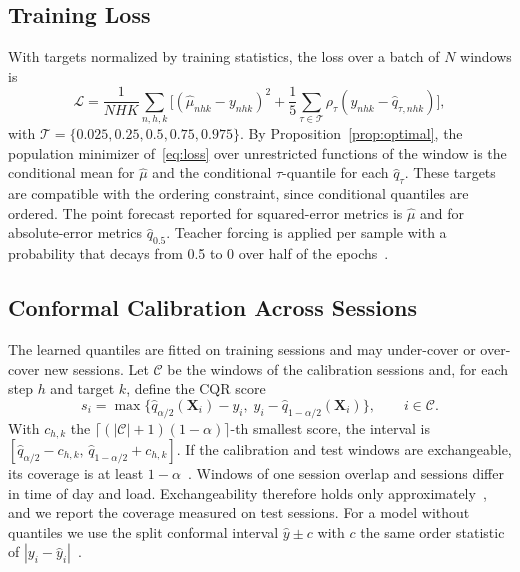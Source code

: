 \subsection{Training Loss}
With targets normalized by training statistics, the loss over a batch of $N$ windows is
\begin{equation}
\mathcal{L}=\frac{1}{NHK}\sum_{n,h,k}\Big[(\hat{\mu}_{nhk}-y_{nhk})^2+\frac{1}{5}\sum_{\tau\in\mathcal{T}}\rho_\tau(y_{nhk}-\hat{q}_{\tau,nhk})\Big],
\label{eq:loss}
\end{equation}
with $\mathcal{T}=\{0.025,0.25,0.5,0.75,0.975\}$. By Proposition~\ref{prop:optimal}, the population minimizer of~\eqref{eq:loss} over unrestricted functions of the window is the conditional mean for $\hat{\mu}$ and the conditional $\tau$-quantile for each $\hat{q}_\tau$. These targets are compatible with the ordering constraint, since conditional quantiles are ordered. The point forecast reported for squared-error metrics is $\hat{\mu}$ and for absolute-error metrics $\hat{q}_{0.5}$. Teacher forcing is applied per sample with a probability that decays from 0.5 to 0 over half of the epochs~\cite{bengio2015scheduled}.

\subsection{Conformal Calibration Across Sessions}
The learned quantiles are fitted on training sessions and may under-cover or over-cover new sessions. Let $\mathcal{C}$ be the windows of the calibration sessions and, for each step $h$ and target $k$, define the CQR score~\cite{romano2019conformalized}
\begin{equation}
s_i=\max\{\hat{q}_{\alpha/2}(\mathbf{X}_i)-y_i,\;y_i-\hat{q}_{1-\alpha/2}(\mathbf{X}_i)\},\qquad i\in\mathcal{C}.
\end{equation}
With $c_{h,k}$ the $\lceil(|\mathcal{C}|+1)(1-\alpha)\rceil$-th smallest score, the interval is $[\hat{q}_{\alpha/2}-c_{h,k},\,\hat{q}_{1-\alpha/2}+c_{h,k}]$. If the calibration and test windows are exchangeable, its coverage is at least $1-\alpha$~\cite{romano2019conformalized}. Windows of one session overlap and sessions differ in time of day and load. Exchangeability therefore holds only approximately~\cite{barber2023conformal}, and we report the coverage measured on test sessions. For a model without quantiles we use the split conformal interval $\hat{y}\pm c$ with $c$ the same order statistic of $|y_i-\hat{y}_i|$~\cite{lei2018distribution}.

